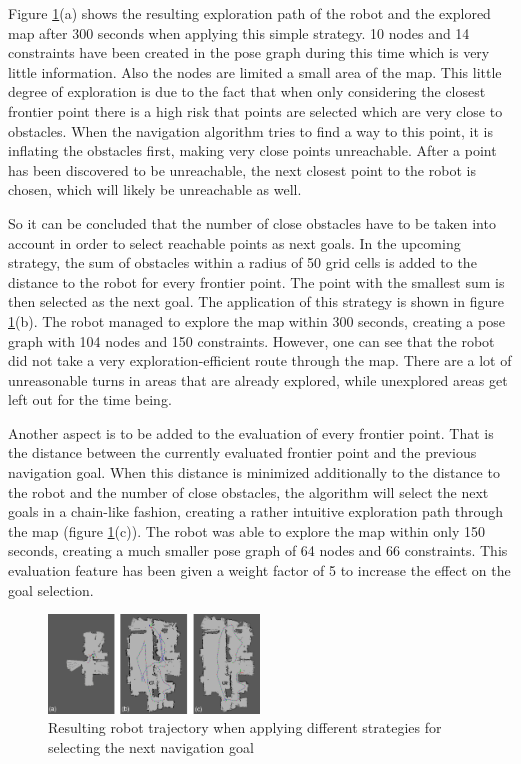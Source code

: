 \documentclass{ba-kecs}
\begin{document}
Figure \ref{fig:navigation_comparison}(a) shows the resulting exploration path of the robot and the explored map after 300 seconds when applying this simple strategy. 10 nodes and 14 constraints have been created in the pose graph during this time which is very little information. Also the nodes are limited a small area of the map. This little degree of exploration is due to the fact that when only considering the closest frontier point there is a high risk that points are selected which are very close to obstacles. When the navigation algorithm tries to find a way to this point, it is inflating the obstacles first, making very close points unreachable. After a point has been discovered to be unreachable, the next closest point to the robot is chosen, which will likely be unreachable as well.

So it can be concluded that the number of close obstacles have to be taken into account in order to select reachable points as next goals. In the upcoming strategy, the sum of obstacles within a radius of 50 grid cells is added to the distance to the robot for every frontier point. The point with the smallest sum is then selected as the next goal. The application of this strategy is shown in figure \ref{fig:navigation_comparison}(b). The robot managed to explore the map within 300 seconds, creating a pose graph with 104 nodes and 150 constraints. However, one can see that the robot did not take a very exploration-efficient route through the map. There are a lot of unreasonable turns in areas that are already explored, while unexplored areas get left out for the time being.

Another aspect is to be added to the evaluation of every frontier point. That is the distance between the currently evaluated frontier point and the previous navigation goal. When this distance is minimized additionally to the distance to the robot and the number of close obstacles, the algorithm will select the next goals in a chain-like fashion, creating a rather intuitive exploration path through the map (figure \ref{fig:navigation_comparison}(c)). The robot was able to explore the map within only 150 seconds, creating a much smaller pose graph of 64 nodes and 66 constraints. This evaluation feature has been given a weight factor of 5 to increase the effect on the goal selection.

\begin{figure}[htbp]
	\centering
		\includegraphics[width=0.50\textwidth]{figures/Navigation_comparison.jpg}
	\caption{Resulting robot trajectory when applying different strategies for selecting the next navigation goal}
	\label{fig:navigation_comparison}
\end{figure}
\end{document}
